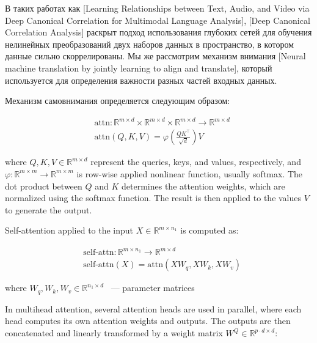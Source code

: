 \documentclass[a4paper,14pt]{article}
\newcommand{\dR}{\mathbb{R}}
\theoremstyle{plain} %
\theoremstyle{definition} %
\theoremstyle{remark} %
\begin{document}
        В таких работах как [Learning Relationships between Text, Audio, and Video via Deep Canonical Correlation for Multimodal Language Analysis], [Deep Canonical Correlation Analysis] раскрыт подход использования глубоких сетей для обучения нелинейных преобразований двух наборов данных в пространство, в котором данные сильно скоррелированы. Мы же рассмотрим механизм внимания [Neural machine translation by jointly learning to align and translate], который используется для определения важности разных частей входных данных. 

        Механизм самовнимания определяется следующим образом:
	
	\begin{equation}
		\begin{aligned}
			&\text{attn}: \mathbb{R}^{m \times d} \times \mathbb{R}^{m \times d} \times \mathbb{R}^{m \times d} \longrightarrow \mathbb{R}^{m \times d} \\
			&\text{attn}(Q, K, V) = \varphi\left(\frac{Q K^\top}{\sqrt{d}}\right) V
		\end{aligned}
		\label{attn}
	\end{equation}
	
        where $Q, K, V \in \dR^{m \times d}$ represent the queries, keys, and values, respectively, and $\varphi: \dR^{m \times m} \longrightarrow \dR^{m \times m}$ is row-wise applied nonlinear function, usually softmax. The dot product between $Q$ and $K$ determines the attention weights, which are normalized using the softmax function. The result is then applied to the values $V$ to generate the output.
	
        Self-attention applied to the input $X \in \dR^{m \times n_1}$ is computed as:
	
	\begin{equation}
		\begin{aligned}
			&\text{self-attn}: \mathbb{R}^{m \times n_1} \longrightarrow \mathbb{R}^{m \times d} \\
			&\text{self-attn}(X) = \text{attn}(X W_q, X W_k, X W_v)
		\end{aligned}
		\label{self-attn}
	\end{equation}

	where $W_q, W_k, W_v \in \dR^{n_1 \times d}$ ~--- parameter matrices
	
        In multihead attention, several attention heads are used in parallel, where each head computes its own attention weights and outputs. The outputs are then concatenated and linearly transformed by a weight matrix $W^Q \in \dR^{p \cdot d \times d}$:
	
\end{document}
